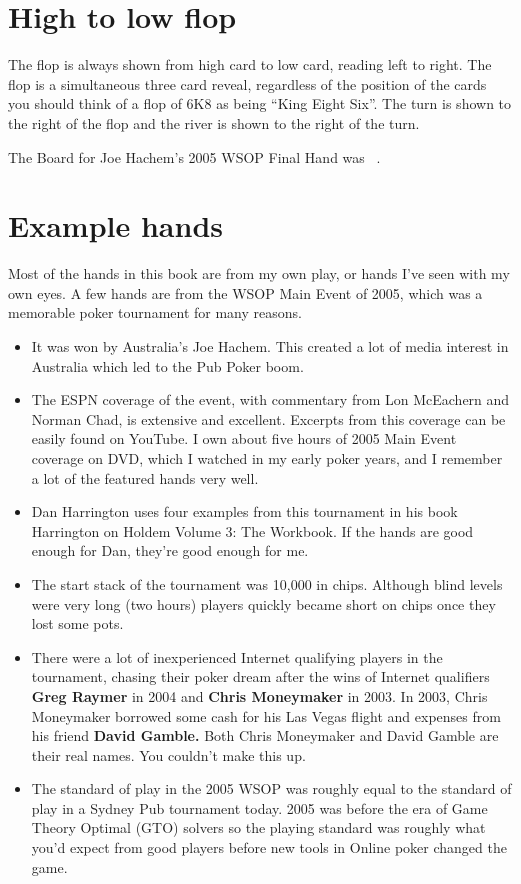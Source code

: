\section*{High to low flop}

The flop is always shown from high card to low card, reading left to
right. The flop is a simultaneous three card reveal, regardless of the
position of the cards you should think of a flop of 6K8 as being
``King Eight Six''. The turn is shown to the right of the flop and the
river is shown to the right of the turn.

The Board for Joe Hachem's 2005 WSOP Final Hand was
\sixh\fived\fourd\As\fourc\ .

\section*{Example hands}

Most of the hands in this book are from my own play, or hands I've
seen with my own eyes. A few hands are from the WSOP Main Event
of 2005, which was a memorable poker tournament for many reasons.

\begin{itemize}
  \item It was won by Australia's Joe Hachem. This created a lot of
    media interest in Australia which led to the Pub Poker boom.
  \item The ESPN coverage of the event, with commentary from
    Lon McEachern and Norman Chad, is extensive and
    excellent. Excerpts from this coverage can be easily found on
    YouTube. I own about five hours of 2005 Main Event coverage on
    DVD, which I watched in my early poker years, and I remember a lot
    of the featured hands very well.
  \item Dan Harrington uses four examples from this tournament in his
    book Harrington on Holdem Volume 3: The Workbook. If the hands are
    good enough for Dan, they're good enough for me.
  \item The start stack of the tournament was 10,000 in
    chips. Although blind levels were very long (two hours)
    players quickly became short on chips once they lost some pots.
  \item There were a lot of inexperienced Internet qualifying players
    in the tournament, chasing their poker dream after the wins of
    Internet qualifiers \textbf{Greg Raymer} in 2004 and \textbf{Chris
    Moneymaker} in 2003. In 2003, Chris Moneymaker
    borrowed some cash for his Las Vegas flight and expenses from his
    friend \textbf{David Gamble.} Both Chris Moneymaker and David Gamble are
    their real names. You couldn't make this up.
  \item The standard of play in the 2005 WSOP was roughly equal to the
    standard of play in a Sydney Pub tournament today. 2005 was before
    the era of Game Theory Optimal (GTO) solvers so the playing
    standard was roughly what you'd expect from good players before
    new tools in Online poker changed the game.

\end{itemize}

